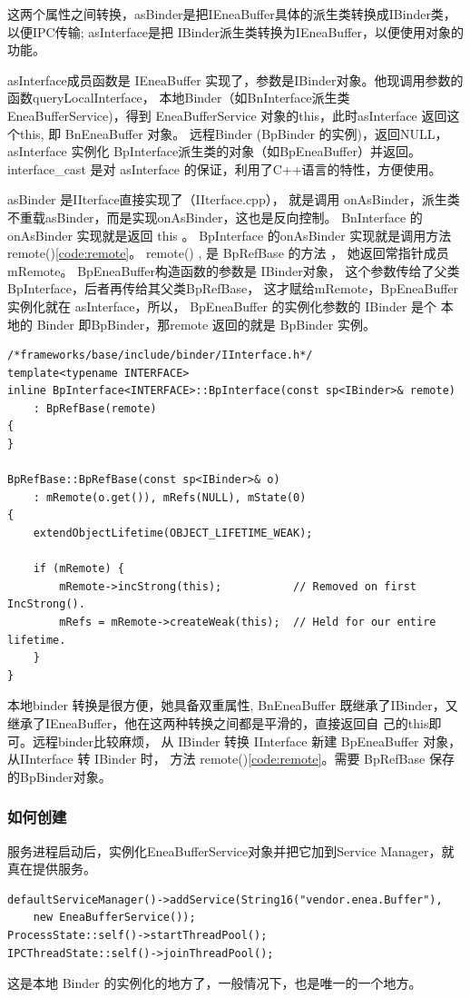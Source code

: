 \documentclass[a4paper,11pt]{article}
\begin{document}
这两个属性之间转换，asBinder是把IEneaBuffer具体的派生类转换成IBinder类，以便IPC传输; asInterface是把
IBinder派生类转换为IEneaBuffer，以便使用对象的功能。 


asInterface\label{code:asInterface}成员函数是
IEneaBuffer 实现了，参数是IBinder对象。他现调用参数的函数queryLocalInterface，
本地Binder（如BnInterface派生类EneaBufferService)，得到 EneaBufferService 对象的this，此时asInterface
返回这个this, 即 BnEneaBuffer 对象。 远程Binder (BpBinder 的实例)，返回NULL，
asInterface 实例化 BpInterface派生类的对象（如BpEneaBuffer）并返回。
interface_cast 是对 asInterface 的保证，利用了C++语言的特性，方便使用。

asBinder 是IIterface直接实现了（IIterface.cpp）， 就是调用 onAsBinder，派生类
不重载asBinder，而是实现onAsBinder，这也是反向控制。 BnInterface 的onAsBinder  实现就是返回 this 。
 BpInterface 的onAsBinder 实现就是调用方法 remote()\ref{code:remote}。
remote() \label{code:remote} , 是  BpRefBase 的方法
 ， 她返回常指针成员 mRemote。 BpEneaBuffer构造函数的参数是 IBinder对象，
 这个参数传给了父类BpInterface，后者再传给其父类BpRefBase， 这才赋给mRemote，BpEneaBuffer 实例化就在 asInterface，所以，
 BpEneaBuffer 的实例化参数的 IBinder 是个 本地的 Binder 即BpBinder，那remote
 返回的就是 BpBinder 实例。
\begin{lstlisting}[caption=BpInterface 的构造函数]
/*frameworks/base/include/binder/IInterface.h*/
template<typename INTERFACE>
inline BpInterface<INTERFACE>::BpInterface(const sp<IBinder>& remote)
    : BpRefBase(remote)
{
}

BpRefBase::BpRefBase(const sp<IBinder>& o)
    : mRemote(o.get()), mRefs(NULL), mState(0)
{
    extendObjectLifetime(OBJECT_LIFETIME_WEAK);

    if (mRemote) {
        mRemote->incStrong(this);           // Removed on first IncStrong().
        mRefs = mRemote->createWeak(this);  // Held for our entire lifetime.
    }
}

\end{lstlisting}



本地binder 转换是很方便，她具备双重属性, BnEneaBuffer
既继承了IBinder，又继承了IEneaBuffer，他在这两种转换之间都是平滑的，直接返回自
己的this即可。远程binder比较麻烦， 从 IBinder 转换
IInterface 新建 BpEneaBuffer 对象，从IInterface 转 IBinder 时， 方法
remote()\ref{code:remote}。需要 BpRefBase
保存的BpBinder对象。


 
\subsubsection{如何创建}
服务进程启动后，实例化EneaBufferService对象并把它加到Service Manager，就真在提供服务。 
\begin{lstlisting}[label={addservice}]
defaultServiceManager()->addService(String16("vendor.enea.Buffer"),
    new EneaBufferService());
ProcessState::self()->startThreadPool();
IPCThreadState::self()->joinThreadPool();
\end{lstlisting}
这是本地 Binder 的实例化的地方了，一般情况下，也是唯一的一个地方。
\end{document}
